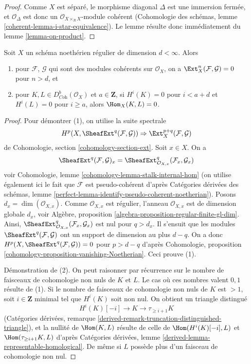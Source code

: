 \begin{proof}
Comme $X$ est séparé, le morphisme diagonal $\Delta$ est une immersion
fermée, et $\mathcal{O}_\Delta$ est donc un
$\mathcal{O}_{X \times_R X}$-module cohérent (Cohomologie des schémas, lemme
\ref{coherent-lemma-i-star-equivalence}).
Le lemme résulte donc immédiatement du lemme \ref{lemma-on-product}.
\end{proof}

\begin{lemma}
\label{lemma-Ext-0-regular}
Soit $X$ un schéma noethérien régulier de dimension $d < \infty$. Alors
\begin{enumerate}
\item pour $\mathcal{F}$, $\mathcal{G}$ qui sont des modules cohérents sur $\mathcal{O}_X$,
on a $\Ext^n_X(\mathcal{F}, \mathcal{G}) = 0$ pour $n > d$, et
\item pour $K, L \in D^b_{\textit{Coh}}(\mathcal{O}_X)$ et $a \in \mathbf{Z}$,
si $H^i(K) = 0$ pour $i < a + d$ et $H^i(L) = 0$ pour $i \geq a$, alors
$\Hom_X(K, L) = 0$.
\end{enumerate}
\end{lemma}

\begin{proof}
Pour démontrer (1), on utilise la suite spectrale
$$
H^p(X, \SheafExt^q(\mathcal{F}, \mathcal{G})) \Rightarrow
\Ext^{p + q}_X(\mathcal{F}, \mathcal{G})
$$
de Cohomologie, section \ref{cohomology-section-ext}. Soit $x \in X$.
On a
$$
\SheafExt^q(\mathcal{F}, \mathcal{G})_x =
\SheafExt^q_{\mathcal{O}_{X, x}}(\mathcal{F}_x, \mathcal{G}_x)
$$
voir Cohomologie, lemme \ref{cohomology-lemma-stalk-internal-hom}
(on utilise également ici le fait que $\mathcal{F}$ est pseudo-cohérent d'après
Catégories dérivées des schémas, lemme
\ref{perfect-lemma-identify-pseudo-coherent-noetherian}).
Posons $d_x = \dim(\mathcal{O}_{X, x})$.
Comme $\mathcal{O}_{X, x}$ est régulier, l'anneau
$\mathcal{O}_{X, x}$ est de dimension globale $d_x$, voir
Algèbre, proposition \ref{algebra-proposition-regular-finite-gl-dim}.
Ainsi, $\SheafExt^q_{\mathcal{O}_{X, x}}(\mathcal{F}_x, \mathcal{G}_x)$
est nul pour $q > d_x$. Il s'ensuit que les modules
$\SheafExt^q(\mathcal{F}, \mathcal{G})$ ont un support
de dimension au plus $d - q$. On a donc
$H^p(X, \SheafExt^q(\mathcal{F}, \mathcal{G})) = 0$ pour $p > d - q$
d'après Cohomologie, proposition \ref{cohomology-proposition-vanishing-Noetherian}.
Ceci prouve (1).

\medskip\noindent
Démonstration de (2).
On peut raisonner par récurrence sur le nombre de faisceaux de cohomologie non nuls
de $K$ et $L$. Le cas où ces nombres valent $0, 1$ résulte
de (1). Si le nombre de faisceaux de cohomologie non nuls de $K$
est $> 1$, soit $i \in \mathbf{Z}$ minimal tel que
$H^i(K)$ soit non nul. On obtient un triangle distingué
$$
H^i(K)[-i] \to K \to \tau_{\geq i + 1}K
$$
(Catégories dérivées, remarque
\ref{derived-remark-truncation-distinguished-triangle}),
et la nullité de $\Hom(K, L)$ résulte de celle
de $\Hom(H^i(K)[-i], L)$ et $\Hom(\tau_{\geq i + 1}K, L)$
d'après Catégories dérivées, lemme \ref{derived-lemma-representable-homological}.
De même si $L$ possède plus d'un faisceau de cohomologie non nul.
\end{proof}

